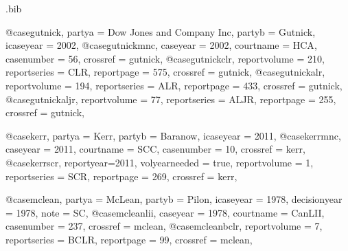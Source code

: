 \begin{filecontents*}{\jobname.bib}

@case{gutnick,
  partya = {Dow Jones and Company Inc}, 
  partyb = {Gutnick},
  icaseyear = {2002},
  }
@case{gutnickmnc,
  caseyear = {2002},
  courtname = {HCA},
  casenumber = {56},
  crossref = {gutnick},
  }
@case{gutnickclr,
  reportvolume = {210},
  reportseries = {CLR},
  reportpage = {575},
  crossref = {gutnick},
  	}
@case{gutnickalr,
  reportvolume = {194},
  reportseries = {ALR},
  reportpage = {433},
  crossref = {gutnick},
  	}
@case{gutnickaljr,
  reportvolume = {77},
  reportseries = {ALJR},
  reportpage = {255},
  crossref = {gutnick},
  	}





@case{kerr,
  partya = {Kerr}, 
  partyb = {Baranow},
  icaseyear = {2011},
  }
@case{kerrmnc,
  caseyear = {2011},
  courtname = {SCC},
  casenumber = {10},
  crossref = {kerr},
  }
@case{kerrscr,
  reportyear={2011},
  volyearneeded = {true},
  reportvolume = {1},
  reportseries = {SCR},
  reportpage = {269},
  crossref = {kerr},
  	}





@case{mclean,
  partya = {McLean}, 
  partyb = {Pilon},
  icaseyear = {1978},
  decisionyear = {1978},
  note = {SC},
  }
@case{mcleanlii,
  caseyear = {1978},
  courtname = {CanLII},
  casenumber = {237},
  crossref = {mclean},
  }
@case{mcleanbclr,
  reportvolume = {7},
  reportseries = {BCLR},
  reportpage = {99},
  crossref = {mclean},
  	}


\end{filecontents*}
